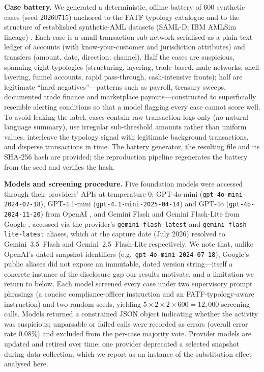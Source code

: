 \documentclass[lineno,pdflatex,sn-basic,Numbered]{sn-jnl}
\begin{document}
\textbf{Case battery.} We generated a deterministic, offline battery of 600 synthetic cases (seed 20260715) anchored to the FATF typology catalogue and to the structure of established synthetic-AML datasets (SAML-D; IBM AMLSim lineage) \cite{samld,amlsim}. Each case is a small transaction sub-network serialised as a plain-text ledger of accounts (with know-your-customer and jurisdiction attributes) and transfers (amount, date, direction, channel). Half the cases are suspicious, spanning eight typologies (structuring, layering, trade-based, mule networks, shell layering, funnel accounts, rapid pass-through, cash-intensive fronts); half are legitimate ``hard negatives''---patterns such as payroll, treasury sweeps, documented trade finance and marketplace payouts---constructed to superficially resemble alerting conditions so that a model flagging every case cannot score well. To avoid leaking the label, cases contain raw transaction logs only (no natural-language summary), use irregular sub-threshold amounts rather than uniform values, interleave the typology signal with legitimate background transactions, and disperse transactions in time. The battery generator, the resulting file and its SHA-256 hash are provided; the reproduction pipeline regenerates the battery from the seed and verifies the hash.

\textbf{Models and screening procedure.} Five foundation models were accessed through their providers' APIs at temperature 0: GPT-4o-mini (\texttt{gpt-4o-mini-2024-07-18}), GPT-4.1-mini (\texttt{gpt-4.1-mini-2025-04-14}) and GPT-4o (\texttt{gpt-4o-2024-11-20}) from OpenAI \cite{gpt4}, and Gemini Flash and Gemini Flash-Lite from Google \cite{gemini}, accessed via the provider's \texttt{gemini-flash-latest} and \texttt{gemini-flash-lite-latest} aliases, which at the capture date (July 2026) resolved to Gemini~3.5~Flash and Gemini~2.5~Flash-Lite respectively. We note that, unlike OpenAI's dated snapshot identifiers (e.g.\ \texttt{gpt-4o-mini-2024-07-18}), Google's public aliases did not expose an immutable, dated version string---itself a concrete instance of the disclosure gap our results motivate, and a limitation we return to below. Each model screened every case under two supervisory prompt phrasings (a concise compliance-officer instruction and an FATF-typology-aware instruction) and two random seeds, yielding $5\times2\times2\times600 = 12{,}000$ screening calls. Models returned a constrained JSON object indicating whether the activity was suspicious; unparsable or failed calls were recorded as errors (overall error rate 0.08\%) and excluded from the per-case majority vote. Provider models are updated and retired over time; one provider deprecated a selected snapshot during data collection, which we report as an instance of the substitution effect analysed here.
\end{document}
